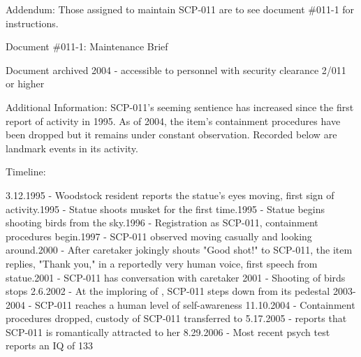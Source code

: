 Addendum: Those assigned to maintain SCP-011 are to see document \#011-1 for instructions.

\begin{bordered}{Document \#011-1: Maintenance Brief}

\lb Document archived 2004 - accessible to personnel with security clearance 2/011 or higher\rb

Additional Information: SCP-011's seeming sentience has increased since the first report of activity in 1995. As of 2004, the item's containment procedures have been dropped but it remains under constant observation. Recorded below are landmark events in its activity.

Timeline:

3.12.1995 - Woodstock resident reports the statue's eyes moving, first sign of activity.1995 - Statue shoots musket for the first time.1995 - Statue begins shooting birds from the sky.1996 - Registration as SCP-011, containment procedures begin.1997 - SCP-011 observed moving casually and looking around.2000 - After caretaker   jokingly shouts "Good shot!" to SCP-011, the item replies, "Thank you," in a reportedly very human voice, first speech from statue.2001 - SCP-011 has conversation with caretaker  
2001 - Shooting of birds stops
2.6.2002 - At the imploring of  , SCP-011 steps down from its pedestal
2003-2004 - SCP-011 reaches a human level of self-awareness
11.10.2004 - Containment procedures dropped, custody of SCP-011 transferred to  
5.17.2005 -   reports that SCP-011 is romantically attracted to her
8.29.2006 - Most recent psych test reports an IQ of 133
\end{bordered}